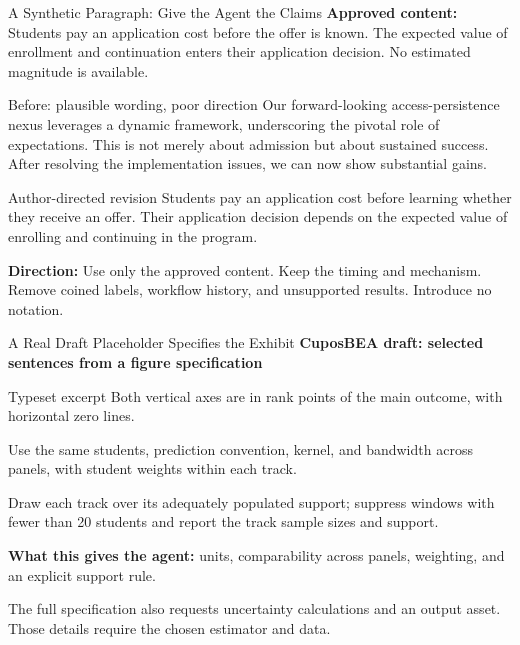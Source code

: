 \begin{frame}{A Synthetic Paragraph: Give the Agent the Claims}
\small
\textbf{Approved content:} Students pay an application cost before the offer is known. The expected value of enrollment and continuation enters their application decision. No estimated magnitude is available.
\par\vspace{0.15cm}
\begin{block}{Before: plausible wording, poor direction}
Our forward-looking access-persistence nexus leverages a dynamic framework, underscoring the pivotal role of expectations. This is not merely about admission but about sustained success. After resolving the implementation issues, we can now show substantial gains.
\end{block}
\begin{block}{Author-directed revision}
Students pay an application cost before learning whether they receive an offer. Their application decision depends on the expected value of enrolling and continuing in the program.
\end{block}
\textbf{Direction:} Use only the approved content. Keep the timing and mechanism. Remove coined labels, workflow history, and unsupported results. Introduce no notation.
\par\vfill
{}
\end{frame}

\begin{frame}{A Real Draft Placeholder Specifies the Exhibit}
\small
\textbf{CuposBEA draft: selected sentences from a figure specification}
\begin{block}{Typeset excerpt}
Both vertical axes are in rank points of the main outcome, with horizontal zero lines.
\par\vspace{0.18cm}
Use the same students, prediction convention, kernel, and bandwidth across panels, with student weights within each track.
\par\vspace{0.18cm}
Draw each track over its adequately populated support; suppress windows with fewer than 20 students and report the track sample sizes and support.
\end{block}
\normalsize \textbf{What this gives the agent:} units, comparability across panels, weighting, and an explicit support rule.
\par\vspace{0.2cm}
\small The full specification also requests uncertainty calculations and an output asset. Those details require the chosen estimator and data.
\par\vfill
{}
\end{frame}

